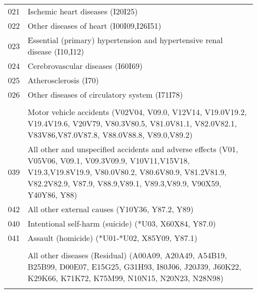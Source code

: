 \begin{longtable}{lp{11cm}}
021 & Ischemic heart diseases (I20I25) \\
022 & Other diseases of heart (I00I09,I26I51) \\
023 & Essential (primary) hypertension and hypertensive renal disease (I10,I12) \\
024 & Cerebrovascular diseases (I60I69) \\
025 & Atherosclerosis (I70) \\
026 & Other diseases of circulatory system (I71I78) \\
\addlinespace
\addlinespace
\multicolumn{2}{l}{\textbf{Group 3}} \\
\addlinespace
038 & Motor vehicle accidents (V02V04, V09.0, V12V14, V19.0V19.2, V19.4V19.6, V20V79, V80.3V80.5, V81.0V81.1, V82.0V82.1, V83V86,V87.0V87.8, V88.0V88.8, V89.0,V89.2) \\
039 & All other and unspecified accidents and adverse effects (V01, V05V06, V09.1, V09.3V09.9, V10V11,V15V18, V19.3,V19.8V19.9, V80.0V80.2, V80.6V80.9, V81.2V81.9, V82.2V82.9, V87.9, V88.9,V89.1, V89.3,V89.9, V90X59, Y40Y86, Y88) \\
042 & All other external causes (Y10Y36, Y87.2, Y89) \\
040 & Intentional self-harm (suicide) (*U03, X60X84, Y87.0) \\
041 & Assault (homicide) (*U01-*U02, X85Y09, Y87.1) \\
\addlinespace
\addlinespace
\multicolumn{2}{l}{\textbf{Group 4}} \\
\addlinespace
037 & All other diseases (Residual) (A00A09, A20A49, A54B19, B25B99, D00E07, E15G25, G31H93, I80J06, J20J39, J60K22, K29K66, K71K72, K75M99, N10N15, N20N23, N28N98) \\
\addlinespace
\addlinespace
\hline
\end{longtable}